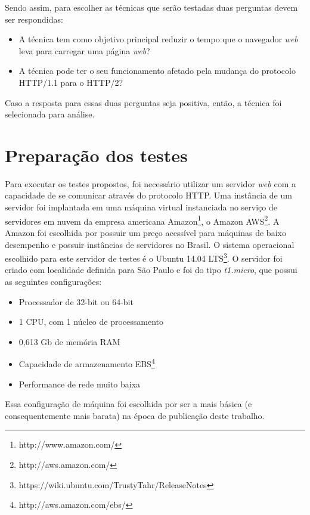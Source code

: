 Sendo assim, para escolher as técnicas que serão testadas duas perguntas devem ser respondidas:

\begin{itemize}
	\item A técnica tem como objetivo principal reduzir o tempo que o navegador \textit{web} leva para carregar uma página \textit{web}?
	\item A técnica pode ter o seu funcionamento afetado pela mudança do protocolo HTTP/1.1 para o HTTP/2?
\end{itemize}

Caso a resposta para essas duas perguntas seja positiva, então, a técnica foi selecionada para análise.

\section{Preparação dos testes}
\label{sec:preparacaodostestes}

Para executar os testes propostos, foi necessário utilizar um servidor \textit{web} com a capacidade de se comunicar através do protocolo HTTP. Uma instância de um servidor foi implantada em uma máquina virtual instanciada no serviço de servidores em nuvem da empresa americana Amazon\footnote{http://www.amazon.com/}, o Amazon AWS\footnote{http://aws.amazon.com/}. A Amazon foi escolhida por possuir um preço acessível para máquinas de baixo desempenho e possuir instâncias de servidores no Brasil. O sistema operacional escolhido para este servidor de testes é o Ubuntu 14.04 LTS\footnote{https://wiki.ubuntu.com/TrustyTahr/ReleaseNotes}. O servidor foi criado com localidade definida para São Paulo e foi do tipo \textit{t1.micro}, que possui as seguintes configurações:

\begin{itemize}
	\item Processador de 32-bit ou 64-bit
	\item 1 CPU, com 1 núcleo de processamento
	\item 0,613 Gb de memória RAM
	\item Capacidade de armazenamento EBS\footnote{http://aws.amazon.com/ebs/}
	\item Performance de rede muito baixa
\end{itemize}

Essa configuração de máquina foi escolhida por ser a mais básica (e consequentemente mais barata) na época de publicação deste trabalho.

